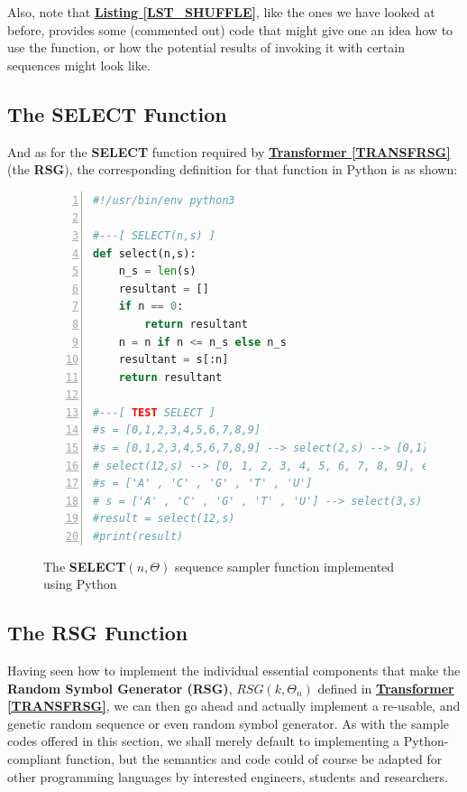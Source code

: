 \documentclass[a4paper, 18pt]{book} %
\begin{document}
Also, note that \textbf{\hyperref[LST_SHUFFLE]{Listing \ref{LST_SHUFFLE}}}, like the ones we have looked at before, provides some (commented out) code that might give one an idea how to use the function, or how the potential results of invoking it with certain sequences might look like.



\subsection{The SELECT Function}

And as for the \textbf{SELECT} function required by \textbf{\hyperref[TRANSFRSG]{Transformer \ref{TRANSFRSG}}} (the \textbf{RSG}), the corresponding definition for that function in Python is as shown:

\begin{figure}[H]
  \begin{center}
  \begin{lstlisting}[caption={The SELECT}, label={LST_SELECT}, language=Python, frame=single, numbers=left, basicstyle=\ttfamily,  commentstyle=\color{blue}]
#!/usr/bin/env python3

#---[ SELECT(n,s) ]
def select(n,s):
    n_s = len(s)
    resultant = []
    if n == 0:
        return resultant
    n = n if n <= n_s else n_s
    resultant = s[:n]
    return resultant

#---[ TEST SELECT ]
#s = [0,1,2,3,4,5,6,7,8,9]
#s = [0,1,2,3,4,5,6,7,8,9] --> select(2,s) --> [0,1], 
# select(12,s) --> [0, 1, 2, 3, 4, 5, 6, 7, 8, 9], etc.
#s = ['A' , 'C' , 'G' , 'T' , 'U']
# s = ['A' , 'C' , 'G' , 'T' , 'U'] --> select(3,s) --> ['A', 'C', 'G'], etc.
#result = select(12,s)
#print(result)
\end{lstlisting}
  \end{center}
  \caption{The \textbf{SELECT}$(n,\Theta)$ sequence sampler function implemented using Python}
\end{figure}



\subsection{The RSG Function}

Having seen how to implement the individual essential components that make the \textbf{Random Symbol Generator (RSG)}, $RSG(k,\Theta_n)$ defined in \textbf{\hyperref[TRANSFRSG]{Transformer \ref{TRANSFRSG}}}, we can then go ahead and actually implement a re-usable, and genetic random sequence or even random symbol generator. As with the sample codes offered in this section, we shall merely default to implementing a Python-compliant function, but the semantics and code could of course be adapted for other programming languages by interested engineers, students and researchers.
\end{document}

